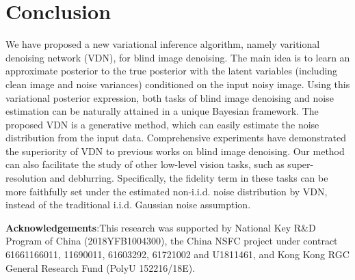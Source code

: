 \documentclass{article}
\begin{document}
\vspace{-2mm}\section{Conclusion}\vspace{-2mm}
We have proposed a new variational inference algorithm, namely varitional denoising network (VDN),
for blind image denoising. The main idea is to learn an approximate posterior to the true posterior
with the latent variables (including clean image and noise variances) conditioned on the input noisy image.
Using this variational posterior expression, both tasks of blind image denoising and noise estimation can
be naturally attained in a unique Bayesian framework. The proposed VDN is a generative method, which can easily
estimate the noise distribution from the input data. Comprehensive experiments have demonstrated the superiority
of VDN to previous works on blind image denoising. Our method can also facilitate the study of other low-level
vision tasks, such as super-resolution and deblurring. Specifically, the fidelity term in these tasks can be
more faithfully set under the estimated non-i.i.d. noise distribution by VDN, instead of the traditional
i.i.d. Gaussian noise assumption.

\vspace{1mm}
\noindent\textbf{Acknowledgements}:This research was supported by National Key R\&D Program of China (2018YFB1004300), the China NSFC project
under contract 61661166011, 11690011, 61603292, 61721002 and U1811461, and Kong Kong RGC General Research Fund
(PolyU 152216/18E).


\end{document}
